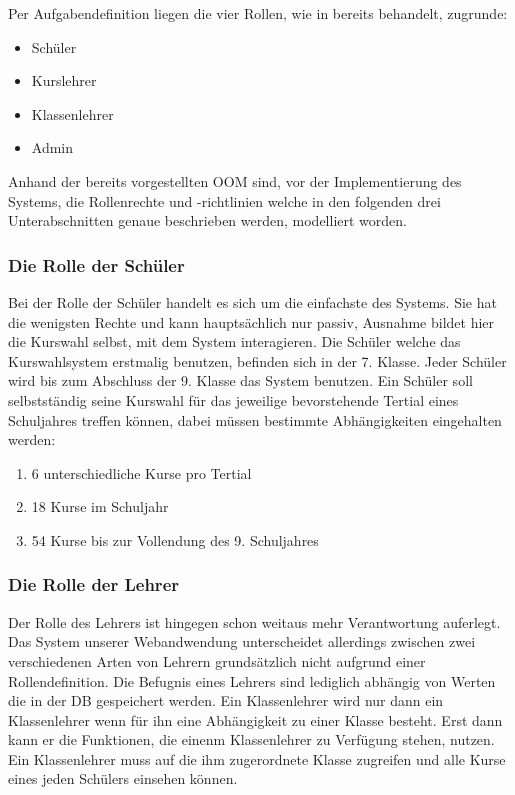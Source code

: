 Per Aufgabendefinition liegen die vier Rollen, wie in  bereits behandelt, zugrunde:

\begin{itemize}
  \item Schüler
  \item Kurslehrer
  \item Klassenlehrer
  \item Admin
\end{itemize}

Anhand der bereits vorgestellten \ac{OOM} sind, vor der Implementierung des Systems, die Rollenrechte und -richtlinien welche in den folgenden drei Unterabschnitten genaue beschrieben werden, modelliert worden.

\subsubsection{Die Rolle der Schüler}

Bei der Rolle der Schüler handelt es sich um die einfachste des Systems. 
Sie hat die wenigsten Rechte und kann hauptsächlich nur passiv, Ausnahme bildet hier die Kurswahl selbst, mit dem System interagieren.
Die Schüler welche das Kurswahlsystem erstmalig benutzen, befinden sich in der 7. Klasse. Jeder Schüler wird bis zum Abschluss der 9. Klasse das System benutzen.
Ein Schüler soll selbstständig seine Kurswahl für das jeweilige bevorstehende Tertial eines Schuljahres treffen können, dabei müssen bestimmte Abhängigkeiten eingehalten werden:

\begin{enumerate}
  \item 6 unterschiedliche Kurse pro Tertial
  \item 18 Kurse im Schuljahr
  \item 54 Kurse bis zur Vollendung des 9. Schuljahres
\end{enumerate}

\subsubsection{Die Rolle der Lehrer}

Der Rolle des Lehrers ist hingegen schon weitaus mehr Verantwortung auferlegt.
Das System unserer Webandwendung unterscheidet allerdings zwischen zwei verschiedenen Arten von Lehrern grundsätzlich nicht aufgrund einer Rollendefinition. 
Die Befugnis eines Lehrers sind lediglich abhängig von Werten die in der \ac{DB} gespeichert werden. 
Ein Klassenlehrer wird nur dann ein Klassenlehrer wenn für ihn eine Abhängigkeit zu einer Klasse besteht. 
Erst dann kann er die Funktionen, die einenm Klassenlehrer zu Verfügung stehen, nutzen.
Ein Klassenlehrer muss auf die ihm zugerordnete Klasse zugreifen und alle Kurse eines jeden Schülers einsehen können.

